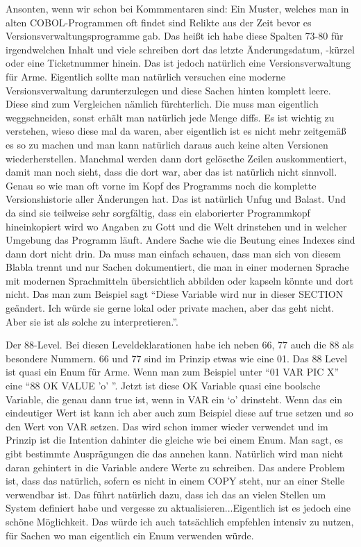 {Ansonten, wenn wir schon bei Kommmentaren sind: Ein Muster, welches man in alten COBOL-Programmen oft findet sind Relikte aus der Zeit bevor es Versionsverwaltungsprogramme gab. Das heißt ich habe diese Spalten 73-80 für irgendwelchen Inhalt und viele schreiben dort das letzte Änderungsdatum, -kürzel oder \zB eine Ticketnummer hinein. Das ist jedoch natürlich eine Versionsverwaltung für Arme. Eigentlich sollte man natürlich versuchen eine moderne Versionsverwaltung darunterzulegen und diese Sachen hinten komplett leere. Diese sind zum Vergleichen nämlich fürchterlich. Die muss man eigentlich weggschneiden, sonst erhält man natürlich jede Menge diffs. Es ist wichtig zu verstehen, wieso diese mal da waren, aber eigentlich ist es nicht mehr zeitgemäß es so zu machen und man kann natürlich daraus auch keine alten Versionen wiederherstellen. Manchmal werden dann dort gelöscthe Zeilen auskommentiert, damit man noch sieht, dass die dort war, aber das ist natürlich nicht sinnvoll. Genau so wie man oft vorne im Kopf des Programms noch die komplette Versionshistorie aller Änderungen hat. Das ist natürlich Unfug und Balast. Und da sind sie teilweise sehr sorgfältig, dass ein elaborierter Programmkopf hineinkopiert wird wo Angaben zu Gott und die Welt drinstehen und in welcher Umgebung das Programm läuft. Andere Sache wie die Beutung eines Indexes sind dann dort nicht drin. Da muss man einfach schauen, dass man sich von diesem Blabla trennt und nur Sachen dokumentiert, die man in einer modernen Sprache mit modernen Sprachmitteln übersichtlich abbilden oder kapseln könnte und dort nicht. Das man zum Beispiel sagt ``Diese Variable wird nur in dieser SECTION geändert. Ich würde sie gerne lokal oder private machen, aber das geht nicht. Aber sie ist als solche zu interpretieren.''.

Der 88-Level. Bei diesen Leveldeklarationen habe ich neben 66, 77 auch die 88 als besondere Nummern. 66 und 77 sind im Prinzip etwas wie eine 01. Das 88 Level ist quasi ein Enum für Arme. Wenn man zum Beispiel unter ``01 VAR PIC X'' eine ``88 OK VALUE 'o' ''. Jetzt ist diese OK Variable quasi eine boolsche Variable, die genau dann true ist, wenn in VAR ein `o' drinsteht. Wenn das ein eindeutiger Wert ist kann ich aber auch zum Beispiel diese auf true setzen und so den Wert von VAR setzen. Das wird schon immer wieder verwendet und im Prinzip ist die Intention dahinter die gleiche wie bei einem Enum. Man sagt, es gibt bestimmte Ausprägungen die das annehen kann. Natürlich wird man nicht daran gehintert in die Variable andere Werte zu schreiben. Das andere Problem ist, dass das natürlich, sofern es nicht in einem COPY steht, nur an einer Stelle verwendbar ist. Das führt natürlich dazu, dass ich das an vielen Stellen um System definiert habe und vergesse zu aktualisieren...Eigentlich ist es jedoch eine schöne Möglichkeit. Das würde ich auch tatsächlich empfehlen intensiv zu nutzen, für Sachen wo man eigentlich ein Enum verwenden würde. }  
